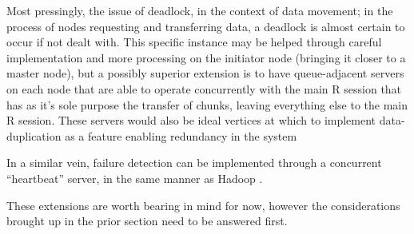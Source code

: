 \documentclass[a4paper,10pt]{article}
\begin{document}
Most pressingly, the issue of deadlock, in the context of data movement; in the
process of nodes requesting and transferring data, a deadlock is almost certain
to occur if not dealt with.
This specific instance may be helped through careful implementation and more
processing on the initiator node (bringing it closer to a master node), but a
possibly superior extension is to have queue-adjacent servers on each node that
are able to operate concurrently with the main R session that has as it's sole
purpose the transfer of chunks, leaving everything else to the main R session.
These servers would also be ideal vertices at which to implement
data-duplication as a feature enabling redundancy in the system

In a similar vein, failure detection can be implemented through a concurrent
``heartbeat'' server, in the same manner as Hadoop \cite{white2012hadoop}.

These extensions are worth bearing in mind for now, however the considerations
brought up in the prior section need to be answered first.

\printbibliography{}
\end{document}

